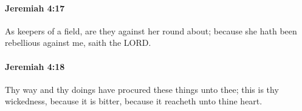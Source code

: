 		\paragraph{Jeremiah 4:17} %
			\label{JEREMIAH-4-17}

			As keepers of a field, are they against her round about; because she hath been rebellious against me, saith the LORD.


		\paragraph{Jeremiah 4:18} %
			\label{JEREMIAH-4-18}

			Thy way and thy doings have procured these things unto thee; this is thy wickedness, because it is bitter, because it reacheth unto thine heart.


